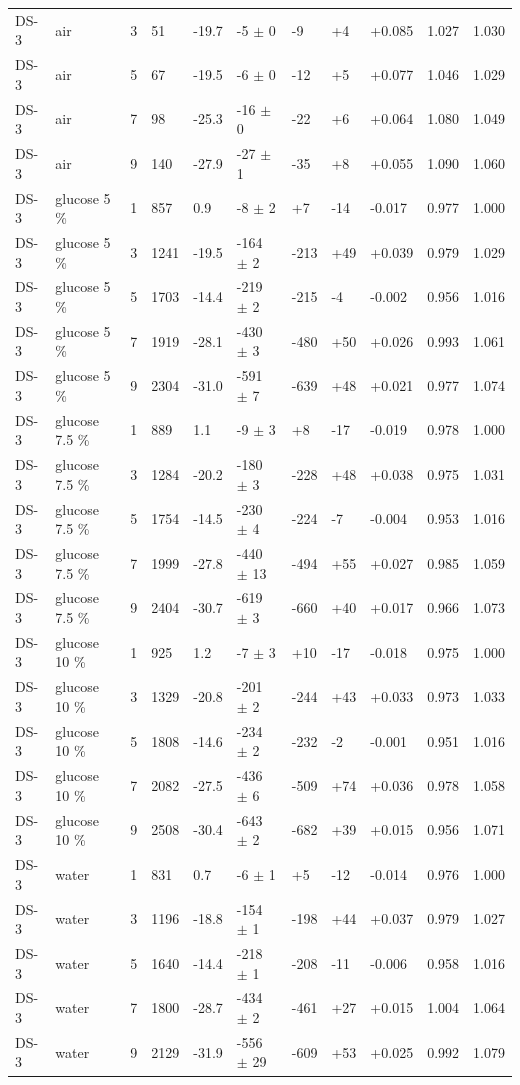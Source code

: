 \documentclass[11pt,a4paper]{article}
\begin{document}
\begin{landscape}
{\begin{longtable}{@{}lllllllllll@{}}
DS-3 & air & 3 & 51 & -19.7 & -5 $\pm$ 0 & -9 & +4 & +0.085 & 1.027 & 1.030 \\
DS-3 & air & 5 & 67 & -19.5 & -6 $\pm$ 0 & -12 & +5 & +0.077 & 1.046 & 1.029 \\
DS-3 & air & 7 & 98 & -25.3 & -16 $\pm$ 0 & -22 & +6 & +0.064 & 1.080 & 1.049 \\
DS-3 & air & 9 & 140 & -27.9 & -27 $\pm$ 1 & -35 & +8 & +0.055 & 1.090 & 1.060 \\
DS-3 & glucose 5 \% & 1 & 857 & 0.9 & -8 $\pm$ 2 & +7 & -14 & -0.017 & 0.977 & 1.000 \\
DS-3 & glucose 5 \% & 3 & 1241 & -19.5 & -164 $\pm$ 2 & -213 & +49 & +0.039 & 0.979 & 1.029 \\
DS-3 & glucose 5 \% & 5 & 1703 & -14.4 & -219 $\pm$ 2 & -215 & -4 & -0.002 & 0.956 & 1.016 \\
DS-3 & glucose 5 \% & 7 & 1919 & -28.1 & -430 $\pm$ 3 & -480 & +50 & +0.026 & 0.993 & 1.061 \\
DS-3 & glucose 5 \% & 9 & 2304 & -31.0 & -591 $\pm$ 7 & -639 & +48 & +0.021 & 0.977 & 1.074 \\
DS-3 & glucose 7.5 \% & 1 & 889 & 1.1 & -9 $\pm$ 3 & +8 & -17 & -0.019 & 0.978 & 1.000 \\
DS-3 & glucose 7.5 \% & 3 & 1284 & -20.2 & -180 $\pm$ 3 & -228 & +48 & +0.038 & 0.975 & 1.031 \\
DS-3 & glucose 7.5 \% & 5 & 1754 & -14.5 & -230 $\pm$ 4 & -224 & -7 & -0.004 & 0.953 & 1.016 \\
DS-3 & glucose 7.5 \% & 7 & 1999 & -27.8 & -440 $\pm$ 13 & -494 & +55 & +0.027 & 0.985 & 1.059 \\
DS-3 & glucose 7.5 \% & 9 & 2404 & -30.7 & -619 $\pm$ 3 & -660 & +40 & +0.017 & 0.966 & 1.073 \\
DS-3 & glucose 10 \% & 1 & 925 & 1.2 & -7 $\pm$ 3 & +10 & -17 & -0.018 & 0.975 & 1.000 \\
DS-3 & glucose 10 \% & 3 & 1329 & -20.8 & -201 $\pm$ 2 & -244 & +43 & +0.033 & 0.973 & 1.033 \\
DS-3 & glucose 10 \% & 5 & 1808 & -14.6 & -234 $\pm$ 2 & -232 & -2 & -0.001 & 0.951 & 1.016 \\
DS-3 & glucose 10 \% & 7 & 2082 & -27.5 & -436 $\pm$ 6 & -509 & +74 & +0.036 & 0.978 & 1.058 \\
DS-3 & glucose 10 \% & 9 & 2508 & -30.4 & -643 $\pm$ 2 & -682 & +39 & +0.015 & 0.956 & 1.071 \\
DS-3 & water & 1 & 831 & 0.7 & -6 $\pm$ 1 & +5 & -12 & -0.014 & 0.976 & 1.000 \\
DS-3 & water & 3 & 1196 & -18.8 & -154 $\pm$ 1 & -198 & +44 & +0.037 & 0.979 & 1.027 \\
DS-3 & water & 5 & 1640 & -14.4 & -218 $\pm$ 1 & -208 & -11 & -0.006 & 0.958 & 1.016 \\
DS-3 & water & 7 & 1800 & -28.7 & -434 $\pm$ 2 & -461 & +27 & +0.015 & 1.004 & 1.064 \\
DS-3 & water & 9 & 2129 & -31.9 & -556 $\pm$ 29 & -609 & +53 & +0.025 & 0.992 & 1.079 \\
\bottomrule
\end{longtable}}\end{landscape}
\end{document}
